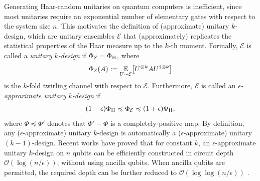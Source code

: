 \documentclass[aps,prl,twocolumn,nofootinbib,superscriptaddress,10pt]{revtex4-2}
\let\originalleft\left
\let\originalright\right
\renewcommand{\left}{\mathopen{}\mathclose\bgroup\originalleft}
\renewcommand{\right}{\aftergroup\egroup\originalright}
\def\E{ {\mathbb E} } %
\theoremstyle{plain}
\theoremstyle{definition}
\begin{document}
Generating Haar-random unitaries on quantum computers is inefficient, since most unitaries require an exponential number of elementary gates with respect to the system size $n$. This motivates the definition of (approximate) unitary $k$-design, which are unitary ensembles $\mathcal E$ that (approximately) replicates the statistical properties of the Haar measure up to the $k$-th moment. 
Formally, $\mathcal E$ is called a \emph{unitary $k$-design} if $\Phi_{\mathcal E}= \Phi_{\rm H}$, where
\begin{align}\label{eq:designDef}
\Phi_{\mathcal E}(A):= \underset{U\sim \mathcal E}{\E} \left[ U^{\otimes k} A U^{\dagger\otimes k} \right] 
\end{align}  
is the $k$-fold twirling channel with respect to $\mathcal E$.
Furthermore, $\mathcal E$ is called an \emph{$\epsilon$-approximate unitary $k$-design} if 
\begin{align}\label{eq:appdesignDef}
(1-\epsilon)\Phi_{\rm H} 
\preccurlyeq \Phi_{\mathcal E} 
\preccurlyeq (1+\epsilon) \Phi_{\rm H},  
\end{align}
where $\Phi\preccurlyeq\Phi'$ denotes that $\Phi'-\Phi$ is a completely-positive map.
By definition, any ($\epsilon$-approximate) unitary $k$-design is automatically a ($\epsilon$-approximate) unitary $(k-1)$-design.
Recent works \cite{schuster2025random, Laracuente2024approximate} have proved that for constant $k$, an $\epsilon$-approximate unitary $k$-design on $n$ qubits can be efficiently constructed in circuit depth $\mathcal O(\log(n/\epsilon))$, without using ancilla qubits. When ancilla qubits are permitted, the required depth can be further reduced to $\mathcal O(\log\log(n/\epsilon))$ \cite{cui2025unitary}.






\end{document}
